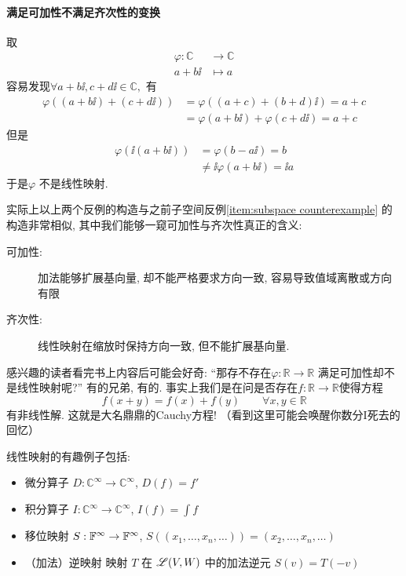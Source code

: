 \paragraph{满足可加性不满足齐次性的变换}
取
\begin{align*}
    \varphi: \mathbb{C} &\to \mathbb{C} \\
    a+b \ii &\mapsto a
\end{align*}
容易发现\(\forall a+b\ii,c+d\ii \in \mathbb{C},\) 有
\begin{align*}
    \varphi((a+b\ii)+(c+d\ii)) &= \varphi((a+c)+(b+d)\ii) = a+c \\
    &=\varphi(a+b\ii) + \varphi(c+d\ii) =a+c
\end{align*}
但是
\begin{align*}
    \varphi(\ii(a+b\ii)) &= \varphi(b-a\ii) = b \\
    &\neq \ii\varphi(a+b\ii) =\ii a
\end{align*}
于是\(\varphi\) 不是线性映射.

实际上以上两个反例的构造与之前子空间反例\ref{item:subspace
counterexample}
的构造非常相似, 其中我们能够一窥可加性与齐次性真正的含义:
\begin{description}
    \item[可加性:] 加法能够扩展基向量, 却不能严格要求方向一致, 容易导致值域离散或方向有限
    \item[齐次性:] 线性映射在缩放时保持方向一致, 但不能扩展基向量.
\end{description}

感兴趣的读者看完书上内容后可能会好奇: ``那存不存在\(\varphi: \mathbb{R} \to
\mathbb{R}\) 满足可加性却不是线性映射呢?'' 有的兄弟, 有的.
事实上我们是在问是否存在\(f:\mathbb{R} \to \mathbb{R}\)使得方程
\[
    f(x+y) = f(x) + f(y) \qquad \forall x,y \in \mathbb{R}
\]
有非线性解. 这就是大名鼎鼎的Cauchy方程! （看到这里可能会唤醒你数分I死去的回忆）

线性映射的有趣例子包括:
\begin{itemize}
    \item 微分算子 \(D: \mathbb{C}^{\infty} \to
        \mathbb{C}^{\infty}\), \(D(f) = f'\)
    \item 积分算子 \(I: \mathbb{C}^{\infty} \to
        \mathbb{C}^{\infty}\), \(I(f) = \int f\)
    \item 移位映射 \(S: \mathbb{F}^{\infty} \to \mathbb{F}^{\infty}\),
        \(S((x_{1},\dots, x_{n}, \dots)) = (x_{2},\dots,
        x_{n}, \dots)\)
    \item （加法）逆映射 映射 \(T\) 在 \(\mathscr{L}(V,W)\) 中的加法逆元
        \(S(v)=T(-v)\)
\end{itemize}
